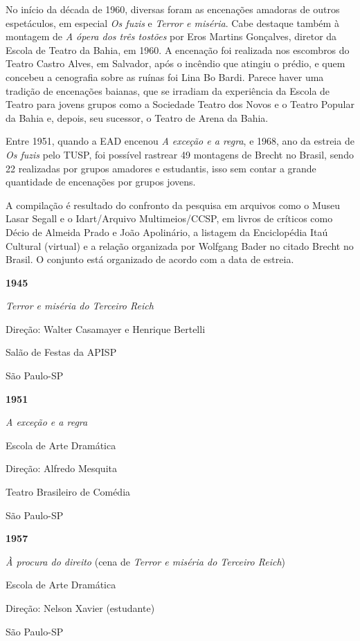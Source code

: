 No início da década de 1960, diversas foram as encenações amadoras de
outros espetáculos, em especial \textit{Os fuzis} e \textit{Terror e miséria}.
Cabe destaque também à montagem de \textit{A ópera dos três tostões} por
Eros Martins Gonçalves, diretor da Escola de Teatro da Bahia, em 1960. A
encenação foi realizada nos escombros do Teatro Castro Alves, em
Salvador, após o incêndio que atingiu o prédio, e quem concebeu a
cenografia sobre as ruínas foi Lina Bo Bardi. Parece haver uma tradição
de encenações baianas, que se irradiam da experiência da Escola de
Teatro para jovens grupos como a Sociedade Teatro dos Novos e o Teatro
Popular da Bahia e, depois, seu sucessor, o Teatro de Arena da Bahia.

Entre 1951, quando a EAD encenou \textit{A exceção e a regra}, e 1968, ano
da estreia de \textit{Os fuzis} pelo TUSP, foi possível rastrear 49
montagens de Brecht no Brasil, sendo 22 realizadas por grupos amadores e
estudantis, isso sem contar a grande quantidade de encenações por grupos
jovens.

A compilação é resultado do confronto da pesquisa em arquivos como o
Museu Lasar Segall e o Idart/Arquivo Multimeios/CCSP, em livros de
críticos como Décio de Almeida Prado e João Apolinário, a listagem da
Enciclopédia Itaú Cultural (virtual) e a relação organizada por Wolfgang
Bader no citado Brecht no Brasil. O conjunto está organizado de acordo
com a data de estreia.

\textbf{1945}

\textit{Terror e miséria do Terceiro Reich}

Direção: Walter Casamayer e Henrique Bertelli

Salão de Festas da APISP

São Paulo-SP

\textbf{1951}

\textit{A exceção e a regra}

Escola de Arte Dramática

Direção: Alfredo Mesquita

Teatro Brasileiro de Comédia

São Paulo-SP

\textbf{1957}

\textit{À procura do direito} (cena de \textit{Terror e miséria do Terceiro
Reich})

Escola de Arte Dramática

Direção: Nelson Xavier (estudante)

São Paulo-SP

